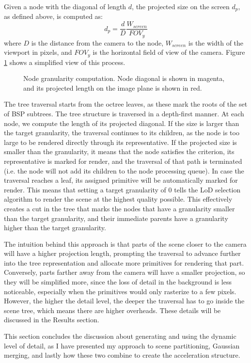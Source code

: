Given a node with the diagonal of length $d$, the projected size on the screen $d_p$, as defined above, is computed as:
\[
d_p = \frac{d}{D}\frac{W_{screen}}{FOV_y}
\]
where $D$ is the distance from the camera to the node, $W_{screen}$ is the width of the viewport in pixels, and $FOV_y$ is the horizontal field of view of the camera. Figure \ref{fig:granularity} shows a simplified view of this process.

\begin{figure}[H]
    \centering
    \makebox[\textwidth][c]{}
    \caption{Node granularity computation. Node diagonal is shown in magenta, and its projected length on the image plane is shown in red.}
    \label{fig:granularity}
\end{figure}


The tree traversal starts from the octree leaves, as these mark the roots of the set of BSP subtrees. The tree structure is traversed in a depth-first manner. At each node, we compute the length of its projected diagonal. If the size is larger than the target granularity, the traversal continues to its children, as the node is too large to be rendered directly through its representative. If the projected size is smaller than the granularity, it means that the node satisfies the criterion, its representative is marked for render, and the traversal of that path is terminated (i.e. the node will not add its children to the node processing queue). In case the traversal reaches a leaf, its assigned primitive will be automatically marked for render. This means that setting a target granularity of 0 tells the LoD selection algorithm to render the scene at the highest quality possible. This effectively creates a cut in the tree that marks the nodes that have a granularity smaller than the target granularity, and their immediate parents have a granularity higher than the target granularity.

The intuition behind this approach is that parts of the scene closer to the camera will have a higher projection length, prompting the traversal to advance further into the tree representation and allocate more primitives for rendering that part. Conversely, parts farther away from the camera will have a smaller projection, so they will be simplified more, since the loss of detail in the background is less noticeable, especially when the primitives would only rasterize to a few pixels. However, the higher the detail level, the deeper the traversal has to go inside the scene tree, which means there are higher overheads. These details will be discussed in the Results section.

This section concludes the discussion about generating and using the dynamic level of detail, as I have presented my approach to scene partitioning, Gaussian merging, and lastly how these two combine to create the acceleration structure.